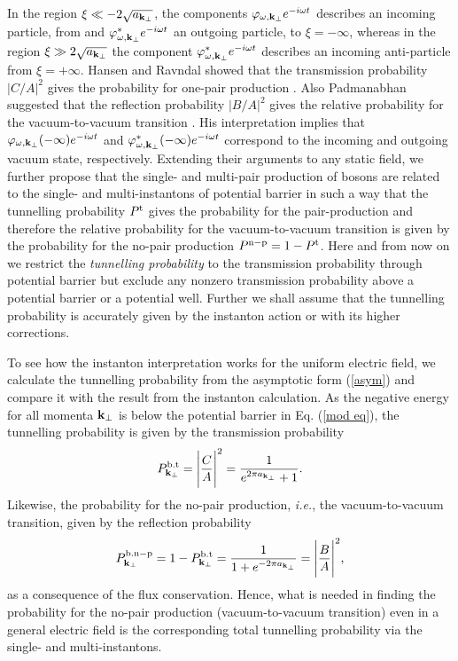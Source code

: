 \documentclass[a4paper,prd,showpacs,preprintnumbers,amsmath,amssymb]{revtex4}
\begin{document}
In the region $\xi \ll - 2 \sqrt{a_{{\bf k}_{\perp}}}$, the
components $\varphi_{\omega, {\bf k}_{\perp}} e^{- i \omega t}$
describes an incoming particle, from and $\varphi^*_{\omega, {\bf
k}_{\perp}} e^{- i \omega t}$ an outgoing particle, to $\xi= -
\infty$, whereas in the region $\xi \gg 2 \sqrt{a_{{\bf
k}_{\perp}}}$ the component $\varphi^*_{\omega, {\bf k}_{\perp}}
e^{- i \omega t}$ describes an incoming anti-particle from $\xi =
+ \infty$.  Hansen and Ravndal showed that the transmission
probability $\vert C/ A \vert^2$ gives the probability for
one-pair production \cite{han}. Also Padmanabhan suggested that
the reflection probability $\vert B/ A \vert^2$ gives the relative
probability for the vacuum-to-vacuum transition \cite{pad,pad2}.
His interpretation implies that $\varphi_{\omega, {\bf k}_{\perp}}
(- \infty) e^{- i \omega t}$ and $\varphi^*_{\omega, {\bf
k}_{\perp}} (- \infty) e^{- i \omega t}$ correspond to the
incoming and outgoing vacuum state, respectively. Extending their
arguments to any static field, we further propose that the single-
and multi-pair production of bosons are related to the single- and
multi-instantons of potential barrier in such a way that the
tunnelling probability $P^{\rm t}$ gives the probability for the
pair-production and therefore the relative probability for the
vacuum-to-vacuum transition is given by the probability for the
no-pair production $P^{\rm n-p} = 1 - P^{\rm t}$. Here and from
now on we restrict the {\it tunnelling probability} to the
transmission probability through potential barrier but exclude any
nonzero transmission probability above a potential barrier or a
potential well. Further we shall assume that the tunnelling
probability is accurately given by the instanton action or with
its higher corrections.





To see how the instanton interpretation works for the uniform
electric field, we calculate the tunnelling probability from the
asymptotic form (\ref{asym}) and compare it with the result from
the instanton calculation. As the negative energy for all momenta
${\bf k}_{\perp}$ is below the potential barrier in Eq. (\ref{mod
eq}), the tunnelling probability is given by the transmission
probability
\begin{equation}
P^{\rm b.t}_{{\bf k}_{\perp}} = \Biggl|\frac{C}{A} \Biggr|^2 =
\frac{1}{e^{2 \pi a_{{\bf k}_{\perp}}} + 1}. \label{tun}
\end{equation}
Likewise, the probability for the no-pair production, {\it i.e.},
the vacuum-to-vacuum transition, given by the reflection
probability
\begin{equation}
P^{\rm b.n-p}_{{\bf k}_{\perp}} = 1 - P^{\rm b.t}_{{\bf
k}_{\perp}} = \frac{1}{1 + e^{ - 2 \pi a_{{\bf k}_{\perp}}}} =
\Biggl|\frac{B}{A} \Biggr|^2, \label{ref}
\end{equation}
as a consequence of the flux conservation. Hence, what is needed
in finding the probability for the no-pair production
(vacuum-to-vacuum transition) even in a general electric field is
the corresponding total tunnelling probability via the single- and
multi-instantons.
\end{document}
